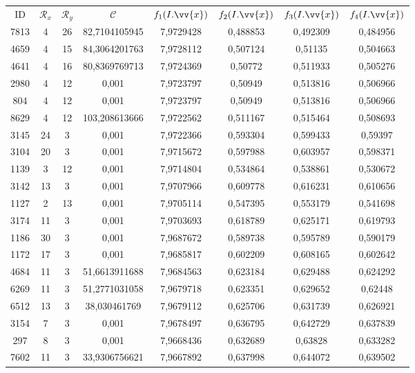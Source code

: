 \scriptsize
\begin{longtable}{|c|c|c|c|c|c|c|c|}
\hline
ID & $\mathscr{R}_x$ & $\mathscr{R}_y$ & $\mathscr{C}$ & $f_1(I.\vv{x})$ & $f_2(I.\vv{x})$ & $f_3(I.\vv{x})$ & $f_4(I.\vv{x})$ \\
7813 & 4 & 26 & 82,7104105945 & 7,9729428 & 0,488853 & 0,492309 & 0,484956 \\
4659 & 4 & 15 & 84,3064201763 & 7,9728112 & 0,507124 & 0,51135 & 0,504663 \\
4641 & 4 & 16 & 80,8369769713 & 7,9724369 & 0,50772 & 0,511933 & 0,505276 \\
2980 & 4 & 12 & 0,001 & 7,9723797 & 0,50949 & 0,513816 & 0,506966 \\
804 & 4 & 12 & 0,001 & 7,9723797 & 0,50949 & 0,513816 & 0,506966 \\
8629 & 4 & 12 & 103,208613666 & 7,9722562 & 0,511167 & 0,515464 & 0,508693 \\
3145 & 24 & 3 & 0,001 & 7,9722366 & 0,593304 & 0,599433 & 0,59397 \\
3104 & 20 & 3 & 0,001 & 7,9715672 & 0,597988 & 0,603957 & 0,598371 \\
1139 & 3 & 12 & 0,001 & 7,9714804 & 0,534864 & 0,538861 & 0,530672 \\
3142 & 13 & 3 & 0,001 & 7,9707966 & 0,609778 & 0,616231 & 0,610656 \\
1127 & 2 & 13 & 0,001 & 7,9705114 & 0,547395 & 0,553179 & 0,541698 \\
3174 & 11 & 3 & 0,001 & 7,9703693 & 0,618789 & 0,625171 & 0,619793 \\
1186 & 30 & 3 & 0,001 & 7,9687672 & 0,589738 & 0,595789 & 0,590179 \\
1172 & 17 & 3 & 0,001 & 7,9685817 & 0,602209 & 0,608165 & 0,602642 \\
4684 & 11 & 3 & 51,6613911688 & 7,9684563 & 0,623184 & 0,629488 & 0,624292 \\
6269 & 11 & 3 & 51,2771031058 & 7,9679718 & 0,623351 & 0,629652 & 0,62448 \\
6512 & 13 & 3 & 38,030461769 & 7,9679112 & 0,625706 & 0,631739 & 0,626921 \\
3154 & 7 & 3 & 0,001 & 7,9678497 & 0,636795 & 0,642729 & 0,637839 \\
297 & 8 & 3 & 0,001 & 7,9668436 & 0,632689 & 0,63828 & 0,633282 \\
7602 & 11 & 3 & 33,9306756621 & 7,9667892 & 0,637998 & 0,644072 & 0,639502 \\

\end{longtable}
